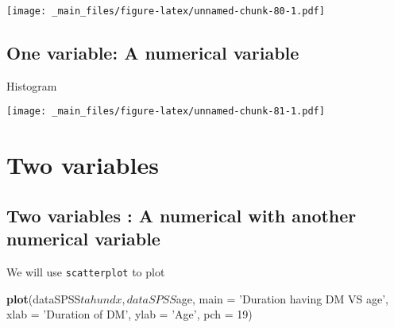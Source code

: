 \documentclass[]{book}
\newenvironment{Shaded}{\begin{snugshade}}{\end{snugshade}}
\newcommand{\KeywordTok}[1]{\textcolor[rgb]{0.13,0.29,0.53}{\textbf{{#1}}}}
\newcommand{\DataTypeTok}[1]{\textcolor[rgb]{0.13,0.29,0.53}{{#1}}}
\newcommand{\DecValTok}[1]{\textcolor[rgb]{0.00,0.00,0.81}{{#1}}}
\newcommand{\StringTok}[1]{\textcolor[rgb]{0.31,0.60,0.02}{{#1}}}
\newcommand{\NormalTok}[1]{{#1}}
\theoremstyle{definition}
\theoremstyle{definition}
\theoremstyle{remark}
\begin{document}
\begin{Shaded}
\end{Shaded}

\texttt{[image: \_main\_files/figure-latex/unnamed-chunk-80-1.pdf]}

\subsection{One variable: A numerical
variable}\label{one-variable-a-numerical-variable}

Histogram

\begin{Shaded}
\end{Shaded}

\texttt{[image: \_main\_files/figure-latex/unnamed-chunk-81-1.pdf]}

\section{Two variables}\label{two-variables}

\subsection{Two variables : A numerical with another numerical
variable}\label{two-variables-a-numerical-with-another-numerical-variable}

We will use \texttt{scatterplot} to plot

\begin{Shaded}
\begin{Highlighting}[]
\KeywordTok{plot}\NormalTok{(dataSPSS$tahundx, dataSPSS$age,}
     \DataTypeTok{main =} \StringTok{'Duration having DM VS age'}\NormalTok{,}
     \DataTypeTok{xlab =} \StringTok{'Duration of DM'}\NormalTok{, }\DataTypeTok{ylab =} \StringTok{'Age'}\NormalTok{,}
     \DataTypeTok{pch =} \DecValTok{19}\NormalTok{)}
\end{Highlighting}
\end{Shaded}
\end{document}
